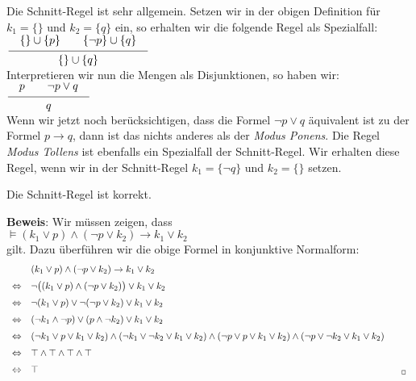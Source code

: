 \noindent
Die Schnitt-Regel ist sehr allgemein.  Setzen wir in der obigen Definition f\"{u}r $k_1 =
\{\}$ und  $k_2 = \{q\}$ 
ein, so erhalten wir die folgende Regel als Spezialfall: \\[0.2cm]
\hspace*{1.3cm} $\schluss{\{\} \cup \{p\} \quad\quad \{\neg p\} \cup \{ q \} }{ \{\} \cup \{q\} }$ \\[0.2cm]
Interpretieren wir nun die Mengen als Disjunktionen, so haben wir: \\[0.2cm]
\hspace*{1.3cm}  $\schluss{p \quad\quad \neg p \vee q }{ q }$ \\[0.2cm]
Wenn wir jetzt noch ber\"{u}cksichtigen, dass die Formel $\neg p \vee q$ \"{a}quivalent ist zu der
Formel $p \rightarrow q$, dann ist das nichts anderes als der \emph{\color{blue}Modus Ponens}.  
Die Regel \emph{\color{blue}Modus Tollens} ist ebenfalls ein Spezialfall der Schnitt-Regel.  Wir
erhalten diese Regel, wenn wir in der Schnitt-Regel $k_1 = \{ \neg q \}$ und $k_2 = \{\}$ setzen.

\begin{Satz}
  Die Schnitt-Regel ist korrekt.
\end{Satz}
\textbf{Beweis}:  Wir m\"{u}ssen zeigen, dass \\[0.2cm]
\hspace*{1.3cm} $\models (k_1 \vee p) \wedge (\neg p \vee k_2) \rightarrow k_1 \vee k_2$ \\[0.2cm]
gilt.  Dazu \"{u}berf\"{u}hren wir die obige Formel in konjunktive Normalform:
$$
\begin{array}{ll}
  & (k_1 \vee p) \wedge (\neg p \vee k_2) \rightarrow k_1 \vee k_2  \\[0.2cm]
\Leftrightarrow  & 
    \neg \bigl( (k_1 \vee p) \wedge (\neg p \vee k_2) \bigr) \vee k_1 \vee k_2 \\[0.2cm]
\Leftrightarrow  & 
    \neg (k_1 \vee p) \vee \neg (\neg p \vee k_2) \vee k_1 \vee k_2 \\[0.2cm]
\Leftrightarrow  & 
     (\neg k_1 \wedge \neg p) \vee  (p \wedge \neg k_2) \vee k_1 \vee k_2 \\[0.2cm]
\Leftrightarrow  & 
     (\neg k_1 \vee p \vee k_1 \vee k_2)  \wedge 
     (\neg k_1 \vee \neg k_2 \vee k_1 \vee k_2)  \wedge 
     (\neg p \vee p \vee k_1 \vee k_2)  \wedge 
     (\neg p \vee \neg k_2 \vee k_1 \vee k_2) 
      \\[0.2cm]
\Leftrightarrow  & 
     \verum  \wedge 
     \verum  \wedge 
     \verum  \wedge 
     \verum 
      \\[0.2cm]
\Leftrightarrow  & 
     \verum    \hspace*{13.5cm} _\Box
      \\
\end{array}
$$



